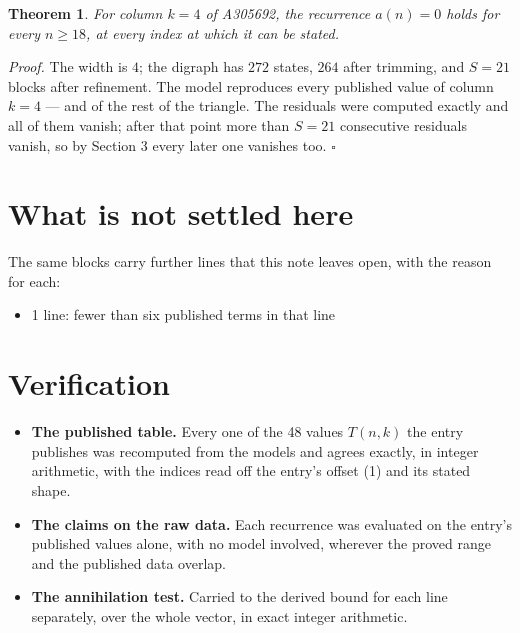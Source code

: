 \documentclass[11pt]{article}
\newtheorem{theorem}{Theorem}
\theoremstyle{definition}
\begin{document}
\begin{theorem} For column $k = 4$ of A305692, the recurrence $a(n) = 0$ holds for every $n \ge 18$, at every index at which it can be stated.\end{theorem}

{\itshape Proof.} The width is $4$; the digraph has $272$ states, $264$ after trimming, and $S = 21$ blocks after refinement. The model reproduces every published value of column $k = 4$ --- and of the rest of the triangle. The residuals were computed exactly and all of them vanish; after that point more than $S = 21$ consecutive residuals vanish, so by Section 3 every later one vanishes too. $\square$

\section{What is not settled here}

The same blocks carry further lines that this note leaves open, with the reason for each:

\begin{itemize}

\item 1 line: fewer than six published terms in that line

\end{itemize}

\section{Verification}

\begin{itemize}

\item {\bfseries The published table.} Every one of the 48 values $T(n,k)$ the entry publishes was recomputed from the models and agrees exactly, in integer arithmetic, with the indices read off the entry's offset (1) and its stated shape.

\item {\bfseries The claims on the raw data.} Each recurrence was evaluated on the entry's published values alone, with no model involved, wherever the proved range and the published data overlap.

\item {\bfseries The annihilation test.} Carried to the derived bound for each line separately, over the whole vector, in exact integer arithmetic.

\end{itemize}
\end{document}

